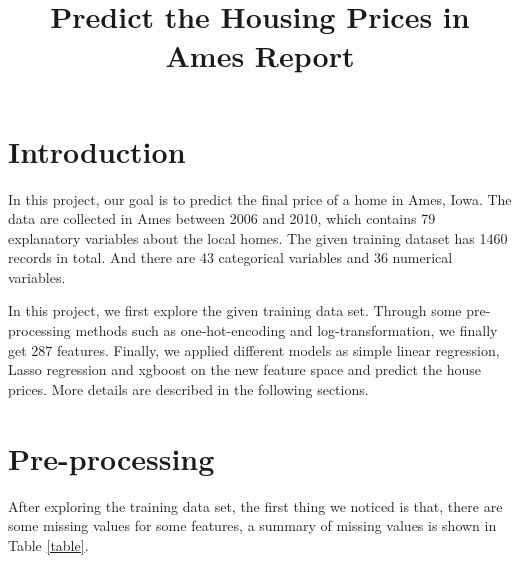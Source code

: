 \documentclass[12pt]{article}
\title{Predict the Housing Prices in Ames Report}
\begin{document}
%
\maketitle

\section{Introduction}
In this project, our goal is to predict the final price of a home in Ames, Iowa. The data are collected in Ames between 2006 and 2010, which contains 79 explanatory variables about the local homes. The given training dataset has 1460 records in total. And there are 43 categorical variables and 36 numerical variables. 

In this project, we first explore the given training data set. Through some pre-processing methods such as one-hot-encoding and log-transformation, we finally get 287 features. Finally, we applied different models as simple linear regression, Lasso regression and xgboost on the new feature space and predict the house prices. More details are described in the following sections.

\section{Pre-processing}
After exploring the training data set, the first thing we noticed is that, there are some missing values for some features, a summary of missing values is shown in Table \ref{table}.
\end{document}
